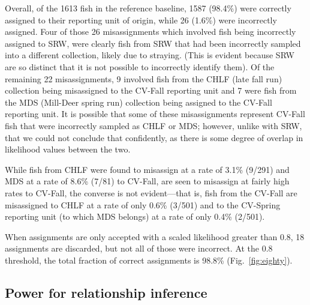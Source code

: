 Overall, of the 1613 fish in the reference baseline, 1587 (98.4\%) were correctly
assigned to their reporting unit of origin, while 26 (1.6\%) were incorrectly assigned.
Four of those 26 misassignments which involved fish being incorrectly assigned to
SRW, were clearly fish from SRW that had been incorrectly sampled into a different
collection, likely due to straying. (This is evident because SRW are so distinct that it is not possible
to incorrectly identify them).  Of the remaining 22 misassignments,  9 involved fish from the
CHLF (late fall run) collection being misassigned to the CV-Fall reporting unit and 7 were
fish from the MDS (Mill-Deer spring run) collection being assigned to the CV-Fall reporting unit.
It is possible that some of these misassignments represent CV-Fall fish that were incorrectly
sampled as CHLF or MDS; however, unlike with SRW, that we could not conclude that
confidently, as there is some degree of overlap in likelihood values between the two.

While fish from CHLF were found to misassign at a rate of 3.1\% (9/291) and MDS at a rate 
of 8.6\% (7/81) to CV-Fall, are seen to misassign at fairly high rates to CV-Fall, the
converse is not evident---that is, fish from the CV-Fall are misassigned to CHLF at a rate
of only 0.6\% (3/501) and to the CV-Spring reporting unit (to which MDS belongs) at a rate
of only 0.4\% (2/501).  

When assignments are only accepted with a scaled likelihood greater than 0.8,
18 assignments are discarded, but not all of those were incorrect.  At the 0.8 threshold,
the total fraction of correct assignments is 98.8\% (Fig.~\ref{fig:eighty}).







\subsection*{Power for relationship inference}

